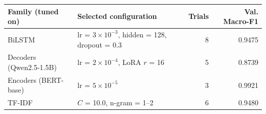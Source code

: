 \begin{tabular}{@{}llrr@{}}
\toprule
Family (tuned on) & Selected configuration & Trials & Val. Macro-F1 \\
\midrule
BiLSTM & lr = $3\times10^{-3}$, hidden = 128, dropout = 0.3 & 8 & 0.9475 \\
Decoders (Qwen2.5-1.5B) & lr = $2\times10^{-4}$, LoRA $r$ = 16 & 5 & 0.8739 \\
Encoders (BERT-base) & lr = $5\times10^{-5}$ & 3 & 0.9921 \\
TF-IDF & $C$ = 10.0, n-gram = 1--2 & 6 & 0.9480 \\
\bottomrule
\end{tabular}
